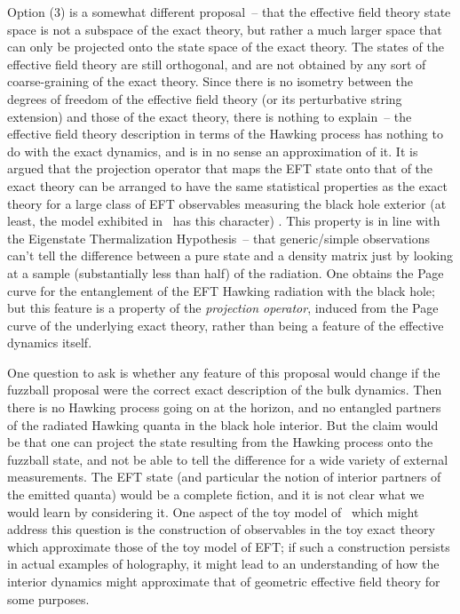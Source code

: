 \documentclass[11pt]{article}
\newcommand{\rcite}{\cite}
\numberwithin{equation}{section}
\begin{document}
Option (3) is a somewhat different proposal~-- that the effective field theory state space is not a subspace of the exact theory, but rather a much larger space that can only be projected onto the state space of the exact theory.  The states of the effective field theory are still orthogonal, and are not obtained by any sort of coarse-graining of the exact theory.  Since there is no isometry between the degrees of freedom of the effective field theory (or its perturbative string extension) and those of the exact theory, there is nothing to explain~-- the effective field theory description in terms of the Hawking process has nothing to do with the exact dynamics, and is in no sense an approximation of it.  It is argued that the projection operator that maps the EFT state onto that of the exact theory can be arranged to have the same statistical properties as the exact theory for a large class of EFT observables measuring the black hole exterior (at least, the model exhibited in~\rcite{Akers:2022qdl} has this character) .  This property is in line with the Eigenstate Thermalization Hypothesis~-- that generic/simple observations can't tell the difference between a pure state and a density matrix just by looking at a sample (substantially less than half) of the radiation.
One obtains the Page curve for the entanglement of the EFT Hawking radiation with the black hole; but this feature is a property of the {\it projection operator}, induced from the Page curve of the underlying exact theory, rather than being a feature of the effective dynamics itself.

One question to ask is whether any feature of this proposal would change if the fuzzball proposal were the correct exact description of the bulk dynamics.  Then there is no Hawking process going on at the horizon, and no entangled partners of the radiated Hawking quanta in the black hole interior.  But the claim would be that one can project the state resulting from the Hawking process onto the fuzzball state, and not be able to tell the difference for a wide variety of external measurements.  The EFT state (and particular the notion of interior partners of the emitted quanta) would be a complete fiction, and it is not clear what we would learn by considering it.  One aspect of the toy model of~\rcite{Akers:2022qdl} which might address this question is the construction of observables in the toy exact theory which approximate those of the toy model of EFT; if such a construction persists in actual examples of holography, it might lead to an understanding of how the interior dynamics might approximate that of geometric effective field theory for some purposes.
\end{document}
